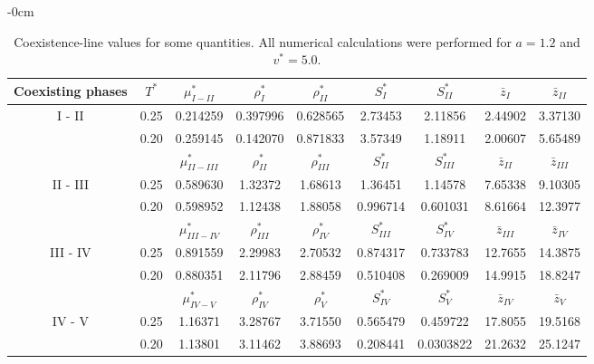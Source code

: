 \documentclass[entropy,article,submit,pdftex,moreauthors]{Definitions/mdpi}
\begin{document}
\begin{table}[H]
	\caption{Coexistence-line values for some quantities. All numerical calculations were performed for $a=1.2$ and $v^*=5.0$.\label{tab2}}
	\begin{adjustwidth}{-\extralength}{0cm}
		\begin{tabularx}{\fulllength}{C|C|CCCCCCC}
		Coexisting phases	&$T^*$	& $\mu^*_{I-II}$	& $\rho^*_I$   & $\rho^*_{II}$ & $S^*_{I}$ & $S^*_{II}$ & $\bar{z}_{I}$ & $\bar{z}_{II}$ \\
			\midrule
			 &
			0.25 & 0.214259 & 0.397996 & 0.628565 & 2.73453 & 2.11856 & 2.44902 & 3.37130 \\
			&0.20 & 0.259145 & 0.142070 & 0.871833 & 3.57349 & 1.18911 & 2.00607 & 5.65489 \\
			
			\midrule
				& & $\mu^*_{II-III}$	& $\rho^*_{II}$   & $\rho^*_{III}$ & $S^*_{II}$ & $S^*_{III}$ & $\bar{z}_{II}$ & $\bar{z}_{III}$ \\
			\midrule
			& 0.25 & 0.589630 & 1.32372 & 1.68613 & 1.36451 & 1.14578 & 7.65338 & 9.10305 \\
			& 0.20 & 0.598952 & 1.12438 & 1.88058 & 0.996714 & 0.601031 & 8.61664 & 12.3977 \\
			
			\midrule
			& & $\mu^*_{III-IV}$	& $\rho^*_{III}$   & $\rho^*_{IV}$ & $S^*_{III}$ & $S^*_{IV}$ & $\bar{z}_{III}$ & $\bar{z}_{IV}$ \\
			\midrule
			& 0.25 & 0.891559 & 2.29983 & 2.70532 & 0.874317 &0.733783 & 12.7655 & 14.3875 \\
			& 0.20 & 0.880351 & 2.11796 & 2.88459 & 0.510408 & 0.269009 & 14.9915 & 18.8247 \\
			
			\midrule
			& & $\mu^*_{IV-V}$	& $\rho^*_{IV}$   & $\rho^*_{V}$ & $S^*_{IV}$ & $S^*_{V}$ & $\bar{z}_{IV}$ & $\bar{z}_{V}$\\
			\midrule
			& 0.25 & 1.16371 & 3.28767 & 3.71550 & 0.565479 & 0.459722 & 17.8055 & 19.5168 \\
			& 0.20 & 1.13801 & 3.11462 & 3.88693 & 0.208441 & 0.0303822 & 21.2632 & 25.1247 \\
			
			\bottomrule
		\end{tabularx}
	\end{adjustwidth}
\end{table}
\end{document}
